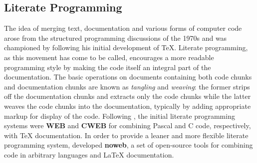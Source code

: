 \documentclass[10pt,a4paper,twoside]{article}
\let\pkg=\textbf
\let\proglang=\textsf
\begin{document}
\subsection{Literate Programming} \label{sec:literate}

The idea of merging text, documentation and various forms of computer code
arose from the structured programming discussions of the 1970s and was
championed by \cite{repro:Knuth:1992} following his initial development of
{\TeX}.  Literate programming, as this movement has come to be called, 
encourages a more readable programming style by making the code itself an
integral part of the documentation. The basic operations on documents 
containing both code chunks and documentation chunks are known as \emph{tangling} and
\emph{weaving}: the former strips off the documentation chunks and extracts only
the code chunks while the latter weaves the code chunks into the documentation,
typically by adding appropriate markup for display of the code. Following
\cite{repro:Knuth:1992}, the initial literate programming systems were
\pkg{WEB} and \pkg{CWEB} for combining \proglang{Pascal} and \proglang{C}
code, respectively, with {\TeX} documentation. In order to provide a leaner
and more flexible literate programming system, \cite{repro:Ramsey:1994}
developed \pkg{noweb}, a set of open-source tools for combining code in
arbitrary languages and {\LaTeX} documentation. 
\end{document}
